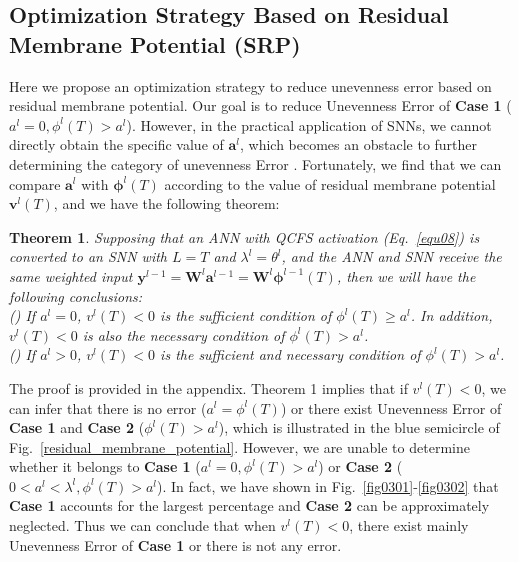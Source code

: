 \documentclass[letterpaper]{article} %
\newtheorem{theorem}{Theorem}
\begin{document}
\subsection{Optimization Strategy Based on Residual Membrane Potential (SRP)}
Here we propose an optimization strategy to reduce unevenness error based on residual membrane potential. Our goal is to reduce Unevenness Error \uppercase\expandafter{} of \textbf{Case 1} (${a}^l=0, \phi^l(T)> {a}^l$). However, in the practical application of SNNs, we cannot directly obtain the specific value of $\boldsymbol{a}^l$, which becomes an obstacle to further determining the category of unevenness Error \uppercase\expandafter{}. Fortunately, we find that we can compare $\boldsymbol{a}^l$ with $\boldsymbol{\phi}^l(T)$ according to the value of residual membrane potential $\boldsymbol{v}^l(T)$, and we have the following theorem:

\begin{theorem}
Supposing that an ANN with QCFS activation (Eq.~\eqref{equ08}) is converted to an SNN with $L=T$ and $\lambda^l={\theta}^l$, and the ANN and SNN receive the same weighted input $\boldsymbol{y}^{l-1} = \boldsymbol{W}^{l} \boldsymbol{a}^{l-1}= \boldsymbol{W}^{l}\boldsymbol{\phi}^{l-1}(T)$,
 then we will have the following conclusions:\\
() If ${a}^l=0$, ${v}^l(T)<0$ is the sufficient condition of $\phi^l(T) \geqslant{a}^l$. In addition, ${v}^l(T)<0$ is also the necessary condition of $\phi^l(T)>{a}^l$.\\ 
() If ${a}^l>0$, ${v}^l(T)<0$ is the sufficient and necessary condition of $\phi^l(T)>{a}^l$.
\label{thm06}
\end{theorem}





The proof is provided in the appendix. Theorem 1 implies that if ${v}^l(T)<0$, we can infer that there is no error (${a}^l={\phi}^l(T)$) or there exist Unevenness Error \uppercase\expandafter{} of \textbf{Case 1} and \textbf{Case 2} ($\phi^l(T)>{a}^l$), which is illustrated in the blue semicircle of Fig.~\ref{residual_membrane_potential}. However, we are unable to determine whether it belongs to \textbf{Case 1} (${a}^l=0, \phi^l(T)>{a}^l$) or \textbf{Case 2} ($0<{a}^l<\lambda^l,\phi^l(T)>{a}^l$). In fact, we have shown in Fig.~\ref{fig0301}-\ref{fig0302} that \textbf{Case 1} accounts for the largest percentage and \textbf{Case 2} can be approximately neglected. Thus we can conclude that when ${v}^l(T)< 0$, there exist mainly Unevenness Error \uppercase\expandafter{} of \textbf{Case 1} or there is not any error.
\end{document}
